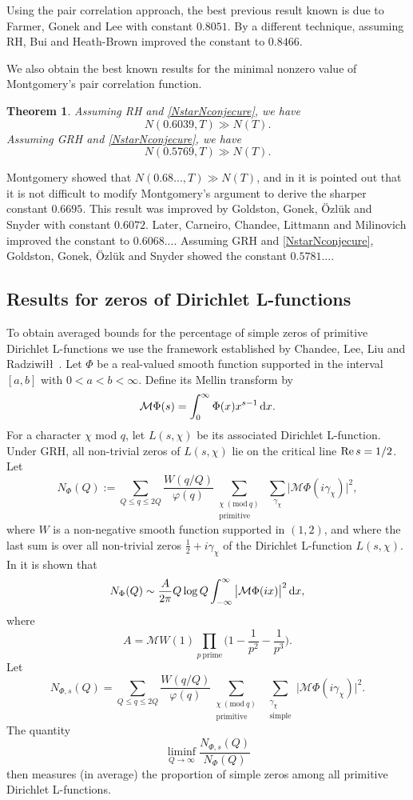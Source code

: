 \documentclass[reqno]{amsart}
\newtheorem{theorem}{Theorem}
\newcommand{\M}{\mathcal{M}}
\newcommand{\re}{{\rm Re}\,}
\newcommand{\hh}{\tfrac12}
\renewcommand{\d}{\,\text{\rm d}}
\begin{document}
Using the pair correlation approach, the best previous result known is due to Farmer, Gonek and Lee \cite{FGL} with constant $0.8051$. By a different technique, assuming RH, Bui and Heath-Brown \cite{BHB} improved the constant to $0.8466$.

We also obtain the best known results for the minimal nonzero value of Montgomery's pair correlation function.

\begin{theorem} \label{thmpaircorreltation}
Assuming RH and \eqref{NstarNconjecure}, we have
\[
N({0.6039},T)\gg N(T).
\]
Assuming GRH and \eqref{NstarNconjecure}, we have
\[
N(0.5769,T)\gg N(T).
\]
\end{theorem}

Montgomery \cite{M} showed that $N(0.68..., T)\gg N(T)$, and in \cite{GGOS} it is pointed out that it is not difficult to modify Montgomery's argument to derive the sharper constant $0.6695$. This result was improved by Goldston, Gonek, \"{O}zl\"{u}k and Snyder \cite{GGOS} with constant $0.6072$. Later,  Carneiro, Chandee, Littmann and Milinovich \cite{CCLM} improved the constant to $0.6068...$. Assuming GRH and \eqref{NstarNconjecure}, Goldston, Gonek, \"{O}zl\"{u}k and Snyder showed the constant $0.5781...$. 

\subsection{Results for zeros of Dirichlet L-functions} To obtain averaged bounds for the percentage of simple zeros of primitive Dirichlet L-functions we use the framework established by Chandee,  Lee, Liu and Radziwi\l\l \ \cite{CLLR}. Let $\Phi$ be a real-valued smooth function supported in the interval $[a,b]$ with $0<a<b<\infty$. Define its Mellin transform by
\[
\mathcal{M}\Phi(s)=\int_{0}^{\infty}\Phi(x)x^{s-1}\d x.
\]
For a character $\chi$ mod $q$, let $L(s,\chi)$ be its associated Dirichlet L-function. Under GRH, all non-trivial zeros of $L(s,\chi)$ lie on the critical line $\re s = 1/2$.
Let 
$$
N_{\Phi}(Q):=\displaystyle\sum_{Q\leq q\leq 2Q}\dfrac{W(q/Q)}{\varphi(q)}\displaystyle\sum_{\substack{\chi  \ (\mathrm{mod} \ q) \\ \text{primitive}}} \displaystyle\;\sum_{\gamma_\chi}\big|\mathcal{M}\Phi(i\gamma_\chi)\big|^2,
$$
where $W$ is a non-negative smooth function supported in $(1,2)$, and where the last sum is over all non-trivial zeros $\hh+i\gamma_\chi$ of the Dirichlet L-function $L(s,\chi)$. In \cite[Lemma 2.1]{CLLR} it is shown that
$$ 
N_{\Phi}(Q)\sim\dfrac{A}{2\pi}Q\log Q \int_{-\infty}^{\infty}\big|\mathcal{M}\Phi(ix)\big|^2\d x,
$$ 
where 
$$
A=\M W(1)\displaystyle\prod_{p\ \text{prime}}\bigg(1-\dfrac{1}{p^2}-\dfrac{1}{p^3}\bigg).
$$
Let
$$
N_{\Phi,s}(Q)=\displaystyle\sum_{Q\leq q\leq 2Q}\dfrac{W(q/Q)}{\varphi(q)}\displaystyle\sum_{\substack{\chi  \ (\mathrm{mod} \ q) \\ \text{primitive}}} \displaystyle\;\sum_{\substack{\gamma_\chi \\ \text{simple}}}\big|\mathcal{M}\Phi(i\gamma_\chi)\big|^2.
$$
The quantity 
$$
\liminf_{Q\to\infty}\frac{N_{\Phi,s}(Q)}{N_{\Phi}(Q)}
$$
then measures (in average) the proportion of simple zeros among all primitive Dirichlet L-functions. 
\end{document}
